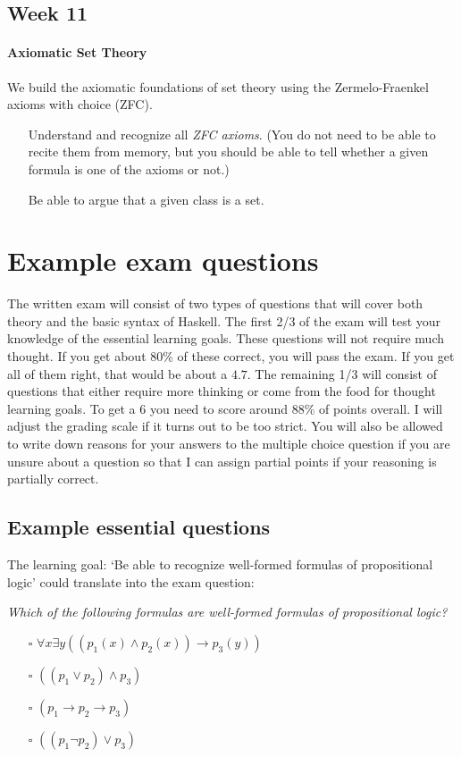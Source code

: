 \documentclass{article}[12pt]
\begin{document}
\subsection*{Week 11}

\paragraph{Axiomatic Set Theory} We build the axiomatic foundations of set theory using the Zermelo-Fraenkel axioms with choice (ZFC).
\begin{itemize}    
    \item[\twemoji{slightly smiling face}] Understand and recognize all \emph{ZFC axioms}. (You do not need to be able to recite them from memory, but you should be able to tell whether a given formula is one of the axioms or not.)
    \item[\twemoji{thinking face}] Be able to argue that a given class is a set.  
\end{itemize}


\section{Example exam questions}
The written exam will consist of two types of questions that will cover both theory and the basic syntax of Haskell. The first 2/3 of the exam will test your knowledge of the essential learning goals. These questions will not require much thought. If you get about 80\% of these correct, you will pass the exam. If you get all of them right, that would be about a $4.7$. The remaining 1/3 will consist of questions that either require more thinking or come from the food for thought learning goals. To get a $6$ you need to score around 88\% of points overall. I will adjust the grading scale if it turns out to be too strict. You will also be allowed to write down reasons for your answers to the multiple choice question if you are unsure about a question so that I can assign partial points if your reasoning is partially correct.

\subsection{Example essential questions}
The learning goal: `Be able to recognize well-formed formulas of propositional logic' could translate into the exam question:

\emph{Which of the following formulas are well-formed formulas of propositional logic?}
\begin{itemize}
    \item[$\square$] $\forall x \exists y ((p_1(x) \wedge p_2(x) ) \rightarrow p_3(y))$
    \item[$\square$] $ ((p_1 \vee p_2) \wedge p_3) $
    \item[$\square$] $ (p_1 \rightarrow p_2 \rightarrow p_3)$
    \item[$\square$] $ ((p_1 \neg p_2) \vee p_3 )$
\end{itemize}
\end{document}
